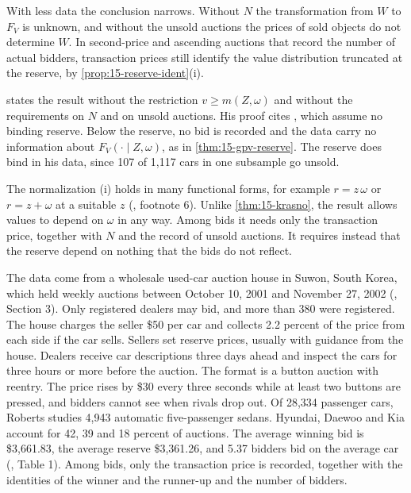 With less data the conclusion narrows. Without $N$ the transformation from $W$ to $F_V$ is unknown, and without
the unsold auctions the prices of sold objects do not determine $W$. In second-price and ascending auctions that
record the number of actual bidders, transaction prices still identify the value distribution truncated at the
reserve, by \cref{prop:15-reserve-ident}(i).

 states the result without the restriction $v\ge m(Z,\omega)$ and
without the requirements on $N$ and on unsold auctions. His proof cites \citet[Theorems 1 and 6]{AtheyHaile2002},
which assume no binding reserve. Below the
reserve, no bid is recorded and the data carry no information about $F_V(\cdot\mid Z,\omega)$, as in
\cref{thm:15-gpv-reserve}. The reserve does bind in his data, since 107 of 1,117 cars in one subsample
go unsold.

The normalization (i) holds in many functional forms, for example $r=z\,\omega$ or $r=z+\omega$ at a
suitable $z$ (\citealp{Roberts2013}, footnote 6). Unlike \cref{thm:15-krasno}, the result allows values
to depend on $\omega$ in any way. Among bids it needs only the transaction price, together with $N$ and the
record of unsold auctions. It requires instead that the
reserve depend on nothing that the bids do not reflect.

The data come from a wholesale used-car auction house in Suwon, South Korea, which held weekly auctions
between October 10, 2001 and November 27, 2002 (\citealp{Roberts2013}, Section 3).
Only registered dealers may bid, and more than 380 were registered. The house charges the seller \$50
per car and collects 2.2 percent of the price from each side if the car sells. Sellers set reserve
prices, usually with guidance from the house. Dealers receive car descriptions three days ahead and
inspect the cars for three hours or more before the auction. The format is a button auction with
reentry. The price rises by \$30 every three seconds while at least two buttons are pressed, and bidders
cannot see when rivals drop out. Of 28,334 passenger cars, Roberts studies 4,943 automatic
five-passenger sedans. Hyundai, Daewoo and Kia account for 42, 39 and 18 percent of auctions. The
average winning bid is \$3,661.83, the average reserve \$3,361.26, and 5.37 bidders bid on the
average car (\citealp{Roberts2013}, Table 1). Among bids, only the transaction price is recorded,
together with the identities of the winner and the runner-up and the number of bidders.

